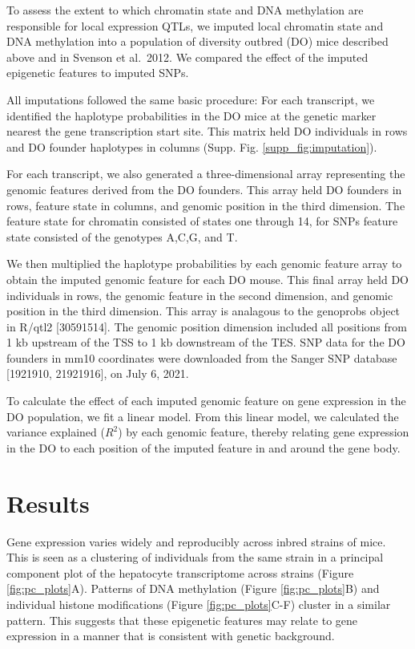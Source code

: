 \documentclass[10pt,letterpaper]{article}
\begin{document}
To assess the extent to which chromatin state and DNA methylation are
responsible for local expression QTLs, we imputed local chromatin state
and DNA methylation into a population of diversity outbred (DO) mice
described above and in Svenson et al.~2012. We compared the effect of
the imputed epigenetic features to imputed SNPs.

All imputations followed the same basic procedure: For each transcript,
we identified the haplotype probabilities in the DO mice at the genetic
marker nearest the gene transcription start site. This matrix held DO
individuals in rows and DO founder haplotypes in columns (Supp. Fig.
\ref{supp_fig:imputation}).

For each transcript, we also generated a three-dimensional array
representing the genomic features derived from the DO founders. This
array held DO founders in rows, feature state in columns, and genomic
position in the third dimension. The feature state for chromatin
consisted of states one through 14, for SNPs feature state consisted of
the genotypes A,C,G, and T.

We then multiplied the haplotype probabilities by each genomic feature
array to obtain the imputed genomic feature for each DO mouse. This
final array held DO individuals in rows, the genomic feature in the
second dimension, and genomic position in the third dimension. This
array is analagous to the genoprobs object in R/qtl2 {[}30591514{]}. The
genomic position dimension included all positions from 1 kb upstream of
the TSS to 1 kb downstream of the TES. SNP data for the DO founders in
mm10 coordinates were downloaded from the Sanger SNP database
{[}1921910, 21921916{]}, on July 6, 2021.

To calculate the effect of each imputed genomic feature on gene
expression in the DO population, we fit a linear model. From this linear
model, we calculated the variance explained (\(R^2\)) by each genomic
feature, thereby relating gene expression in the DO to each position of
the imputed feature in and around the gene body.

\hypertarget{results}{%
\section{Results}\label{results}}

Gene expression varies widely and reproducibly across inbred strains of
mice. This is seen as a clustering of individuals from the same strain
in a principal component plot of the hepatocyte transcriptome across
strains (Figure \ref{fig:pc_plots}A). Patterns of DNA methylation
(Figure \ref{fig:pc_plots}B) and individual histone modifications
(Figure \ref{fig:pc_plots}C-F) cluster in a similar pattern. This
suggests that these epigenetic features may relate to gene expression in
a manner that is consistent with genetic background.
\end{document}
